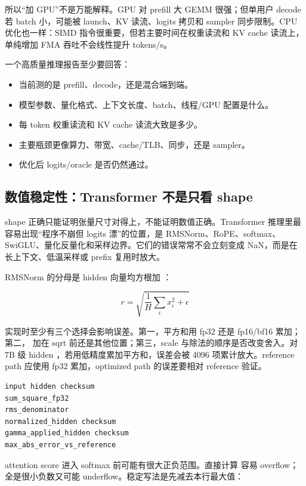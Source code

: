 所以“加 GPU”不是万能解释。GPU 对 prefill 大 GEMM 很强；但单用户 decode 若 batch 小，可能被 launch、KV 读流、logits 拷贝和 sampler 同步限制。CPU 优化也一样：SIMD 指令很重要，但若主要时间在权重读流和 KV cache 读流上，单纯增加 FMA 吞吐不会线性提升 tokens/s。

\begin{rubricbox}
一个高质量推理报告至少要回答：
\begin{itemize}
  \item 当前测的是 prefill、decode，还是混合端到端。
  \item 模型参数、量化格式、上下文长度、batch、线程/GPU 配置是什么。
  \item 每 token 权重读流和 KV cache 读流大致是多少。
  \item 主要瓶颈更像算力、带宽、cache/TLB、同步，还是 sampler。
  \item 优化后 logits/oracle 是否仍然通过。
\end{itemize}
\end{rubricbox}

\subsection{数值稳定性：Transformer 不是只看 shape}

shape 正确只能证明张量尺寸对得上，不能证明数值正确。Transformer 推理里最容易出现“程序不崩但 logits 漂”的位置，是 RMSNorm、RoPE、softmax、SwiGLU、量化反量化和采样边界。它们的错误常常不会立刻变成 NaN，而是在长上下文、低温采样或 prefix 复用时放大。

RMSNorm 的分母是 hidden 向量均方根加 \code{\epsilon}：

\[
r=\sqrt{\frac{1}{H}\sum_i x_i^2+\epsilon}
\]

实现时至少有三个选择会影响误差。第一，平方和用 fp32 还是 fp16/bf16 累加；第二，\code{\epsilon} 加在 sqrt 前还是其他位置；第三，scale \code{\gamma} 与除法的顺序是否改变舍入。对 7B 级 hidden ，若用低精度累加平方和，误差会被 4096 项累计放大。reference path 应使用 fp32 累加，optimized path 的误差要相对 reference 验证。

\begin{lstlisting}[numbers=none,caption={RMSNorm oracle 应记录的中间量}]
input hidden checksum
sum_square_fp32
rms_denominator
normalized_hidden checksum
gamma_applied_hidden checksum
max_abs_error_vs_reference
\end{lstlisting}

attention score 进入 softmax 前可能有很大正负范围。直接计算  容易 overflow；全是很小负数又可能 underflow。稳定写法是先减去本行最大值：

